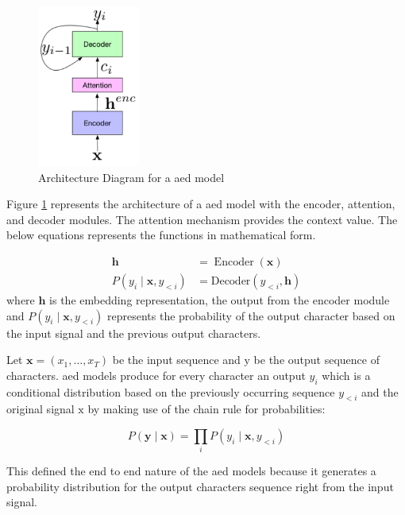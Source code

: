 \begin{figure}[ht]
  \begin{center}
    \includegraphics[width=0.3\textwidth]{images/las.png} 
    \caption{Architecture Diagram for a \acrshort{aed} model  \cite{Chiu2017State-of-the-artModels}}
    \label{fig:las}
  \end{center}
\end{figure}

Figure \ref{fig:las} represents the architecture of a \acrshort{aed} model with the encoder, attention, and decoder modules. The attention mechanism provides the context value. The below equations represents the functions in mathematical form.

$$
\begin{aligned}
\mathbf{h} &=\operatorname{Encoder}(\mathbf{x}) \\
P\left(y_{i} \mid \mathbf{x}, y_{<i}\right) &=\text {Decoder}\left(y_{<i}, \mathbf{h}\right)
\end{aligned}
$$
where $ \mathbf{h}$ is the embedding representation, the output from the encoder module and $P\left(y_{i} \mid \mathbf{x}, y_{<i}\right)$ represents the probability of the output character based on the input signal and the previous output characters.

Let $\mathbf{x}=\left(x_{1}, \ldots, x_{T}\right)$ be the input sequence and $\mathrm{y}$ be the output sequence of characters. \acrshort{aed} models produce for every character an output $y_{i}$ which is a conditional distribution based on the previously occurring sequence $y_{<i}$ and the original signal $\mathrm{x}$ by making use of the chain rule for probabilities:

$$
P(\mathbf{y} \mid \mathbf{x})=\prod_{i} P\left(y_{i} \mid \mathbf{x}, y_{<i}\right)
$$

This defined the end to end nature of the \acrshort{aed} models because it generates a probability distribution for the output characters sequence right from the input signal. 

